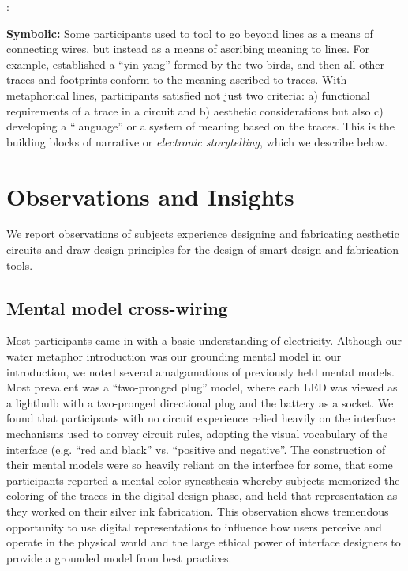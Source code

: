 \documentclass{sigchi}
\begin{document}
  \begin{myquote}
  \vspace{-2pt}
    :
    \vspace{-2pt}
  \end{myquote}
  
  \textbf{Symbolic:} Some participants used to tool to go beyond lines as a means of connecting wires, but instead as a means of ascribing meaning to lines. For example,  established a ``yin-yang'' formed by the two birds, and then all other traces and footprints conform to the meaning ascribed to traces. With metaphorical lines, participants satisfied not just two criteria: a) functional requirements of a trace in a circuit and b) aesthetic considerations but also c) developing a ``language'' or a system of meaning based on the traces.
  This is the building blocks of narrative or \textit{electronic storytelling}, which we describe below.

  
 

\section{Observations and Insights}
  We report observations of subjects experience designing and fabricating aesthetic circuits and draw design principles for the design of smart design and fabrication tools. 
  \subsection{Mental model cross-wiring}
  Most participants came in with a basic understanding of electricity. Although our water metaphor introduction was our grounding mental model in our introduction, we noted several amalgamations of previously held mental models. Most prevalent was a ``two-pronged plug'' model, where each LED was viewed as a lightbulb with a two-pronged directional plug and the battery as a socket. We found that participants with no circuit experience relied heavily on the interface mechanisms used to convey circuit rules, adopting the visual vocabulary of the interface (e.g. ``red and black'' vs. ``positive and negative''. The construction of their mental models were so heavily reliant on the interface for some, that some participants reported a mental color synesthesia whereby subjects memorized the coloring of the traces in the digital design phase, and held that representation as they worked on their silver ink fabrication. This observation shows tremendous opportunity to use digital representations to influence how users perceive and operate in the physical world and the large ethical power of interface designers to provide a grounded model from best practices. 
\end{document}
